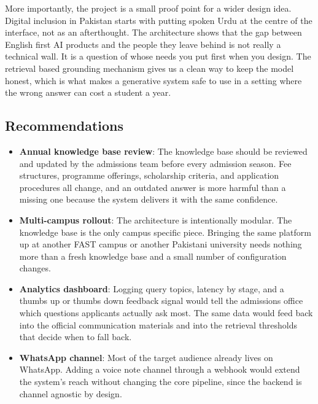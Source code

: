 \documentclass[12pt,a4paper]{report}
\begin{document}
More importantly, the project is a small proof point for a wider design
idea. Digital inclusion in Pakistan starts with putting spoken Urdu at
the centre of the interface, not as an afterthought. The architecture
shows that the gap between English first AI products and the people they
leave behind is not really a technical wall. It is a question of whose
needs you put first when you design. The retrieval based grounding
mechanism gives us a clean way to keep the model honest, which is what
makes a generative system safe to use in a setting where the wrong
answer can cost a student a year.

\subsection{Recommendations}

\begin{itemize}
  \item \textbf{Annual knowledge base review}:
        The knowledge base should be reviewed and updated by the
        admissions team before every admission season. Fee structures,
        programme offerings, scholarship criteria, and application
        procedures all change, and an outdated answer is more harmful
        than a missing one because the system delivers it with the same
        confidence.
  \item \textbf{Multi-campus rollout}:
        The architecture is intentionally modular. The knowledge base is
        the only campus specific piece. Bringing the same platform up at
        another FAST campus or another Pakistani university needs nothing
        more than a fresh knowledge base and a small number of
        configuration changes.
  \item \textbf{Analytics dashboard}:
        Logging query topics, latency by stage, and a thumbs up or
        thumbs down feedback signal would tell the admissions office
        which questions applicants actually ask most. The same data
        would feed back into the official communication materials and
        into the retrieval thresholds that decide when to fall back.
  \item \textbf{WhatsApp channel}:
        Most of the target audience already lives on WhatsApp. Adding a
        voice note channel through a webhook would extend the system's
        reach without changing the core pipeline, since the backend is
        channel agnostic by design.
\end{itemize}
\end{document}
